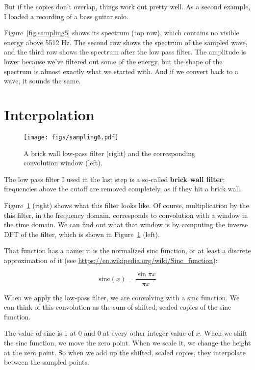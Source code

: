\documentclass[12pt]{book} \usepackage[width=5.5in,height=8.5in, hmarginratio=3:2,vmarginratio=1:1]{geometry}
\begin{document}
But if the copies don't overlap, things work out pretty well. As a second example, I loaded a recording of a bass guitar solo. 

Figure~\ref{fig.sampling5} shows its spectrum (top row), which contains no visible energy above 5512 Hz. The second row shows the spectrum of the sampled wave, and the third row shows the spectrum after the low pass filter. The amplitude is lower because we've filtered out some of the energy, but the shape of the spectrum is almost exactly what we started with. And if we convert back to a wave, it sounds the same. 

\section{Interpolation} 

\begin{figure} 

\centerline{\texttt{[image: figs/sampling6.pdf]}} \caption{A brick wall low-pass filter (right) and the corresponding convolution window (left).} \label{fig.sampling6} \end{figure} 

The low pass filter I used in the last step is a so-called {\bf brick wall filter}; frequencies above the cutoff are removed completely, as if they hit a brick wall. 

Figure~\ref{fig.sampling6} (right) shows what this filter looks like. Of course, multiplication by the this filter, in the frequency domain, corresponds to convolution with a window in the time domain. We can find out what that window is by computing the inverse DFT of the filter, which is shown in Figure~\ref{fig.sampling6} (left). 

That function has a name; it is the normalized sinc function, or at least a discrete approximation of it (see \url{https://en.wikipedia.org/wiki/Sinc_function}): 

\[ \mathrm{sinc}(x) = \frac{\sin \pi x}{\pi x} \] 

When we apply the low-pass filter, we are convolving with a sinc function. We can think of this convolution as the sum of shifted, scaled copies of the sinc function. 

The value of sinc is 1 at 0 and 0 at every other integer value of $x$. When we shift the sinc function, we move the zero point. When we scale it, we change the height at the zero point. So when we add up the shifted, scaled copies, they interpolate between the sampled points. 
\end{document}
